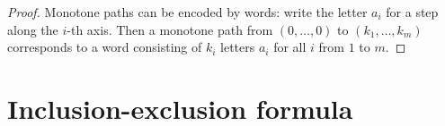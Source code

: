\begin{page}
\setcounter{section}{5}
\setcounter{subsection}{0}
\setcounter{dfn}{3}
\label{portion:122}

\begin{proof}
Monotone paths can be encoded by words: write the letter $a_i$ for a step along the $i$-th axis.
Then a monotone path from $(0, \ldots, 0)$ to $(k_1, \ldots, k_m)$ corresponds to a word
consisting of $k_i$ letters $a_i$ for all $i$ from $1$ to $m$.
\end{proof}




\end{page}

\begin{page}
\setcounter{section}{5}
\setcounter{subsection}{1}
\setcounter{dfn}{0}
\label{portion:123}

\section{Inclusion-exclusion formula}

\end{page}

